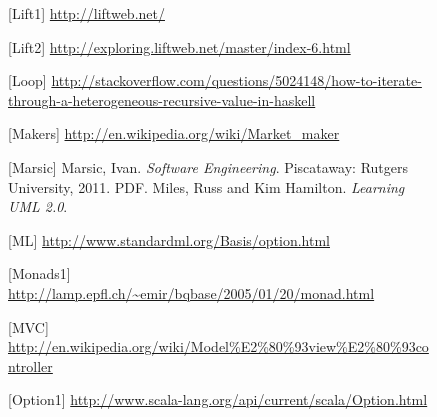 \documentclass[a4]{article}
\begin{document}
\clearpage
\begin{figure}[b][Lift1]
\url{http://liftweb.net/}
\end{figure}
\begin{figure}[b][Lift2]
\url{http://exploring.liftweb.net/master/index-6.html}
\end{figure}
\begin{figure}[b][Loop]
\url{http://stackoverflow.com/questions/5024148/how-to-iterate-through-a-heterogeneous-recursive-value-in-haskell}
\end{figure}
\begin{figure}[b][Makers]
\url{http://en.wikipedia.org/wiki/Market_maker}
\end{figure}
\begin{figure}[b][Marsic]
Marsic, Ivan. \emph{Software Engineering}. Piscataway: Rutgers University, 2011. PDF. Miles,  Russ  and  Kim  Hamilton.  \emph{Learning  UML  2.0}.
\end{figure}
\begin{figure}[b][ML]
\url{http://www.standardml.org/Basis/option.html}
\end{figure}
\begin{figure}[b][Monads1]
\url{http://lamp.epfl.ch/~emir/bqbase/2005/01/20/monad.html}
\end{figure}
\begin{figure}[b][MVC]
\url{http://en.wikipedia.org/wiki/Model\%E2\%80\%93view\%E2\%80\%93controller}
\end{figure}
\begin{figure}[b][Option1]
\url{http://www.scala-lang.org/api/current/scala/Option.html}
\end{figure}
\end{document}
